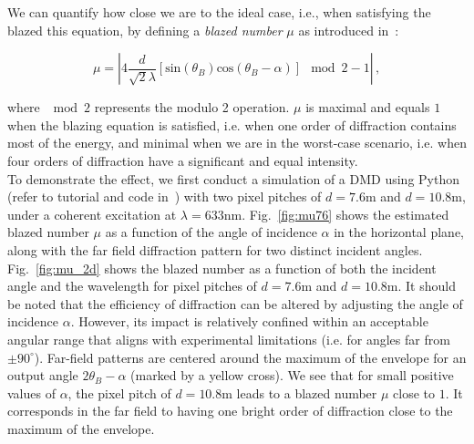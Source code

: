 \documentclass[12pt]{iopart}
\begin{document}
We can quantify how close we are to the ideal case,
i.e., when satisfying the blazed this equation,
by defining a {\em blazed number} $\mu$ as introduced in~\cite{WFSnet_diffraction}:



\begin{equation}
  \mu =
  \left| 4 \frac{d}{\sqrt{2}\lambda}
  \left[
    \text{sin}(\theta_B)\text{cos}(\theta_B-\alpha)
    \right]
  \mod{2} -1
  \right| \, ,
  \label{eq:blazed_number}
\end{equation}

where $\mod{2}$ represents the modulo 2 operation.
$\mu$ is maximal and equals $1$ when the blazing equation is satisfied,
i.e. when one order of diffraction contains most of the energy,
and minimal when we are in the worst-case scenario,
i.e. when four orders of diffraction have a significant and equal intensity.\\


To demonstrate the effect, we first conduct a simulation of a DMD using Python
(refer to tutorial and code in~\cite{WFSnet_diffraction})
with two pixel pitches of
$d=7.6$\textmu m and $d=10.8$\textmu m,
under a coherent excitation at $\lambda=633$nm.
Fig.~\ref{fig:mu76} shows the estimated blazed number $\mu$
as a function of the angle of incidence $\alpha$ in the horizontal plane,
along with the far field diffraction pattern for two distinct incident angles. 
Fig.~\ref{fig:mu_2d} shows the blazed number as a function of both the incident angle 
and the wavelength for pixel pitches of $d=7.6$\textmu m and $d=10.8$\textmu m.
It should be noted that the efficiency of diffraction can be altered by adjusting
the angle of incidence $\alpha$.
However, its impact is relatively confined
within an acceptable angular range that aligns with experimental limitations
(i.e. for angles far from $\pm 90^\circ$).
Far-field patterns are centered around the maximum of the envelope
for an output angle $2\theta_B - \alpha$
(marked by a yellow cross).
We see that for small positive values of $\alpha$,
the pixel pitch of $d=10.8$\textmu m leads to a blazed number $\mu$
close to $1$.
It corresponds in the far field to having one bright order of diffraction
close to the maximum of the envelope.
\end{document}
